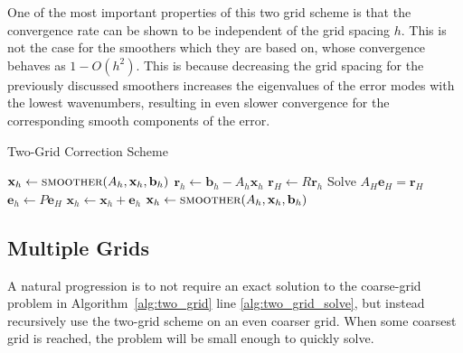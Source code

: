 One of the most important properties of this two grid scheme is that the convergence rate can be shown to be independent of the grid spacing $h$. This is not the case for the smoothers which they are based on, whose convergence behaves as $1 - O(h^2)$. This is because decreasing the grid spacing for the previously discussed smoothers increases the eigenvalues of the error modes with the lowest wavenumbers, resulting in even slower convergence for the corresponding smooth components of the error.

\begin{algorithm}
	\caption{Two-Grid Correction Scheme}\label{alg:two_grid}
	\begin{algorithmic}[1]
			\State $\mathbf{x}_h \gets \Call{smoother}{A_h, \mathbf{x}_h, \mathbf{b}_h}$ 
		\EndFor
		\State $\mathbf{r}_h \gets \mathbf{b}_h - A_h \mathbf{x}_h$ 
		\State $\mathbf{r}_H \gets R \mathbf{r}_h$ 
		\State Solve $A_H \mathbf{e}_H = \mathbf{r}_H$  \label{alg:two_grid_solve}
		\State $\mathbf{e}_h \gets P \mathbf{e}_H$ 
		\State $\mathbf{x}_h \gets \mathbf{x}_h + \mathbf{e}_h$ 
			\State $\mathbf{x}_h \gets \Call{smoother}{A_h, \mathbf{x}_h, \mathbf{b}_h}$ 
		\EndFor
		\EndProcedure
	\end{algorithmic}
\end{algorithm}

\subsection{Multiple Grids}

A natural progression is to not require an exact solution to the coarse-grid problem in Algorithm~\ref{alg:two_grid} line \ref{alg:two_grid_solve}, but instead recursively use the two-grid scheme on an even coarser grid. When some coarsest grid is reached, the problem will be small enough to quickly solve.

